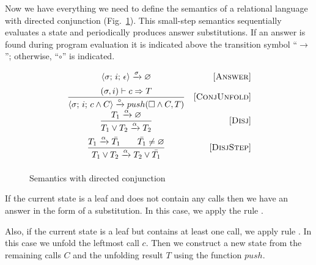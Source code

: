 
Now we have everything we need to define the semantics of a relational language with directed conjunction (Fig.~\ref{fair:classic-semantics}). This small-step semantics sequentially
evaluates a state and periodically produces answer substitutions. If an answer is found during program evaluation it is indicated above the transition
symbol ``$\xrightarrow{}$''; otherwise, ``$\circ$'' is indicated.

\begin{figure}[h!]
\[\begin{array}{cr}
     {\langle \sigma;\, i;\, \epsilon \rangle \xrightarrow{\sigma} \varnothing}  
&     \mbox{[\textsc{Answer}]} \\[2mm]
\dfrac{(\sigma, i) \vdash c \Rightarrow T}
      {\langle \sigma;\, i;\, c \land C \rangle \xrightarrow{\circ} push(\Box \land C, T)}
&     \mbox{[\textsc{ConjUnfold}]} \\[2mm]
\dfrac{T_1 \xrightarrow{\alpha} \varnothing}
      {T_1 \lor T_2 \xrightarrow{\alpha} T_2}
&     \mbox{[\textsc{Disj}]} \\[4mm]
\dfrac{T_1 \xrightarrow{\alpha} \bar{T_1} \qquad \bar{T_1} \not= \varnothing}
      {T_1 \lor T_2 \xrightarrow{\alpha} T_2 \lor\bar{T_1}}
&     \mbox{[\textsc{DisjStep}]} \\[4mm]
\end{array}\]
\caption{Semantics with directed conjunction}
\label{fair:classic-semantics}
\end{figure}

If the current state is a leaf and does not contain any calls then we have an answer in the form of a substitution. In this case, we apply the rule .

Also, if the current state is a leaf but contains at least one call, we apply rule . In this case we unfold the leftmost call $c$.
Then we construct a new state from the remaining calls $C$ and the unfolding result $T$ using the function $push$.

